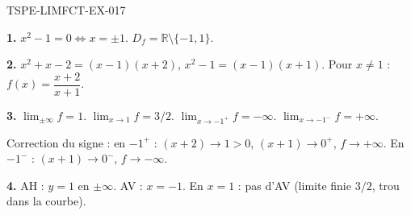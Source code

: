 \begin{corrige}{TSPE-LIMFCT-EX-017}

\textbf{1.} $x^2-1 = 0 \iff x = \pm 1$. $D_f = \mathbb{R} \setminus \{-1, 1\}$.

\textbf{2.} $x^2+x-2 = (x-1)(x+2)$, $x^2-1 = (x-1)(x+1)$. Pour $x
\neq 1$ : $f(x) = \dfrac{x+2}{x+1}$.

\textbf{3.} $\lim_{\pm\infty} f = 1$. $\lim_{x \to 1} f = 3/2$. $\lim_{x \to -1^+} f = -\infty$. $\lim_{x \to -1^-} f = +\infty$.

Correction du signe : en $-1^+$ : $(x+2) \to 1 > 0$, $(x+1) \to 0^+$, $f \to \boxed{+\infty}$. En $-1^-$ : $(x+1) \to 0^-$, $f \to \boxed{-\infty}$.

\textbf{4.} AH : $y = 1$ en $\pm\infty$. AV : $x = -1$. En $x = 1$ : pas d'AV (limite finie $3/2$, trou dans la courbe).

\end{corrige}
